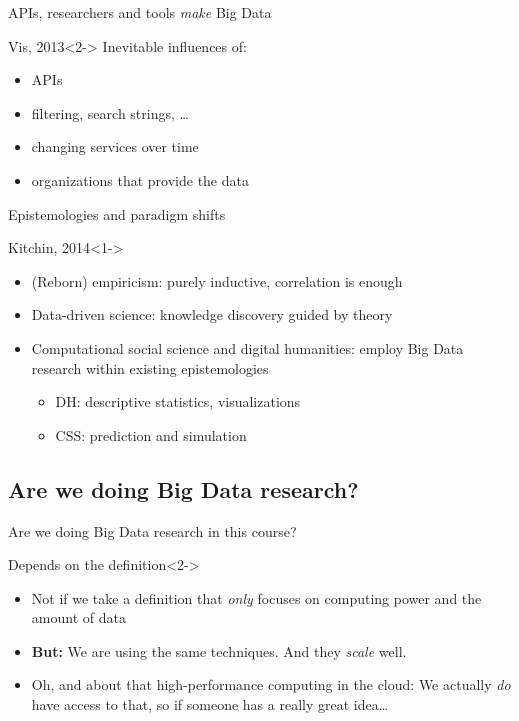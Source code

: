 \begin{frame}{APIs, researchers and tools \emph{make} Big Data}
\begin{block}{Vis, 2013}<2->
Inevitable influences of:
\begin{itemize}
\item APIs
\item filtering, search strings, \ldots
\item changing services over time
\item organizations that provide the data
\end{itemize}
\end{block}
\end{frame}


\begin{frame}{Epistemologies and paradigm shifts}
	\begin{block}{Kitchin, 2014}<1->
		\begin{itemize}
			\item<2-> (Reborn) empiricism: purely inductive, correlation is enough
			\item<3-> Data-driven science: knowledge discovery guided by theory
			\item<4-> Computational social science and digital humanities: employ Big Data research within existing epistemologies
			\begin{itemize}
				\item DH: descriptive statistics, visualizations
				\item CSS: prediction and simulation
			\end{itemize}
		\end{itemize}
	\end{block}
\end{frame}




\subsection{Are we doing Big Data research?}

\begin{frame}{Are we doing Big Data research in this course?}
\begin{block}{Depends on the definition}<2->
\begin{itemize}
\item Not if we take a definition that \emph{only} focuses on computing power and the amount of data
\item<3-> \textbf{But:} We are using the same techniques. And they \emph{scale} well.
\item<4-> Oh, and about that high-performance computing in the cloud: We actually \emph{do} have access to that, so if someone has a really great idea\ldots
\end{itemize}

\end{block}
\end{frame}


